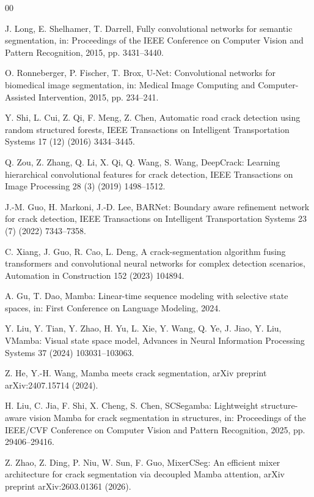 \documentclass[preprint,12pt]{elsarticle}
\begin{document}
\begin{thebibliography}{00}

J. Long, E. Shelhamer, T. Darrell,
Fully convolutional networks for semantic segmentation,
in: Proceedings of the IEEE Conference on Computer Vision and Pattern Recognition, 2015, pp. 3431--3440.

O. Ronneberger, P. Fischer, T. Brox,
U-Net: Convolutional networks for biomedical image segmentation,
in: Medical Image Computing and Computer-Assisted Intervention, 2015, pp. 234--241.

Y. Shi, L. Cui, Z. Qi, F. Meng, Z. Chen,
Automatic road crack detection using random structured forests,
IEEE Transactions on Intelligent Transportation Systems 17 (12) (2016) 3434--3445.

Q. Zou, Z. Zhang, Q. Li, X. Qi, Q. Wang, S. Wang,
DeepCrack: Learning hierarchical convolutional features for crack detection,
IEEE Transactions on Image Processing 28 (3) (2019) 1498--1512.

J.-M. Guo, H. Markoni, J.-D. Lee,
BARNet: Boundary aware refinement network for crack detection,
IEEE Transactions on Intelligent Transportation Systems 23 (7) (2022) 7343--7358.

C. Xiang, J. Guo, R. Cao, L. Deng,
A crack-segmentation algorithm fusing transformers and convolutional neural networks for complex detection scenarios,
Automation in Construction 152 (2023) 104894.

A. Gu, T. Dao,
Mamba: Linear-time sequence modeling with selective state spaces,
in: First Conference on Language Modeling, 2024.

Y. Liu, Y. Tian, Y. Zhao, H. Yu, L. Xie, Y. Wang, Q. Ye, J. Jiao, Y. Liu,
VMamba: Visual state space model,
Advances in Neural Information Processing Systems 37 (2024) 103031--103063.

Z. He, Y.-H. Wang,
Mamba meets crack segmentation,
arXiv preprint arXiv:2407.15714 (2024).

H. Liu, C. Jia, F. Shi, X. Cheng, S. Chen,
SCSegamba: Lightweight structure-aware vision Mamba for crack segmentation in structures,
in: Proceedings of the IEEE/CVF Conference on Computer Vision and Pattern Recognition, 2025, pp. 29406--29416.

Z. Zhao, Z. Ding, P. Niu, W. Sun, F. Guo,
MixerCSeg: An efficient mixer architecture for crack segmentation via decoupled Mamba attention,
arXiv preprint arXiv:2603.01361 (2026).


\end{thebibliography}
\end{document}
